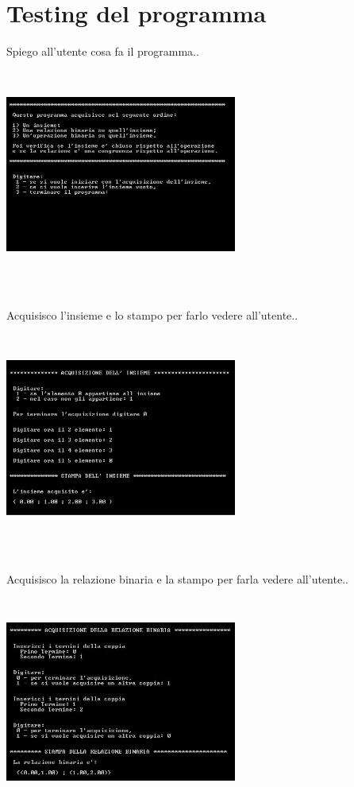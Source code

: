 \documentclass[11pt,a4paper,titlepage,block]{article}
\begin{document}
\section {Testing del programma}
Spiego all'utente cosa fa il programma..
\\
\includegraphics[width=3in,height=3in,viewport=0 0 300 300]{../Screenshots/Capture1.JPG}
\\
\\
Acquisisco l'insieme e lo stampo per farlo vedere all'utente..\\
\includegraphics[width=3in,height=3in,viewport=0 0 300 300]{../Screenshots/Capture2.JPG}\\
\\
\newpage
Acquisisco la relazione binaria e la stampo per farla vedere all'utente..\\
\includegraphics[width=3in,height=3in,viewport=0 0 300 300]{../Screenshots/Capture3.JPG}\\
\end{document}
